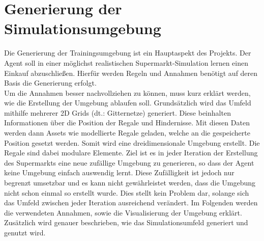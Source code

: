 \newpage
\section{Generierung der Simulationsumgebung}
Die Generierung der Trainingsumgebung ist ein Hauptaspekt des Projekts. Der Agent soll in einer möglichst realistischen Supermarkt-Simulation lernen einen Einkauf abzuschließen. Hierfür werden Regeln und Annahmen benötigt auf deren Basis die Generierung erfolgt. 
\\
Um die Annahmen besser nachvollziehen zu können, muss kurz erklärt werden, wie die Erstellung der Umgebung ablaufen soll. Grundsätzlich wird das Umfeld mithilfe mehrerer 2D Grids (dt.: Gitternetze) generiert. Diese beinhalten Informationen über die Position der Regale und Hindernisse. Mit diesen Daten werden dann Assets wie modellierte Regale geladen, welche an die gespeicherte Position gesetzt werden. Somit wird eine dreidimensionale Umgebung erstellt. Die Regale sind dabei modulare Elemente. Ziel ist es in jeder Iteration der Erstellung des Supermarkts eine neue zufällige Umgebung zu generieren, so dass der Agent keine Umgebung einfach auswendig lernt. Diese Zufälligkeit ist jedoch nur begrenzt umsetzbar und es kann nicht gewährleistet werden, dass die Umgebung nicht schon einmal so erstellt wurde. Dies stellt kein Problem dar, solange sich das Umfeld zwischen jeder Iteration ausreichend verändert. 
Im Folgenden werden die verwendeten Annahmen, sowie die Visualisierung der Umgebung erklärt. Zusätzlich wird genauer beschrieben, wie das Simulationsumfeld generiert und genutzt wird.

